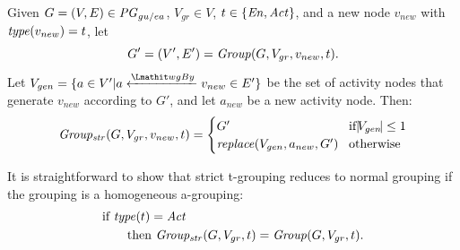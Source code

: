 \begin{definition}
Given 
$G=(V,E) \in \mathit{PG}_{gu/ea}$, $V_{gr} \in V$, $t \in \{\mathit{En}, \mathit{Act}\}$, and a new node $v_{new}$ with $\mathit{type}(v_{new}) = t$, let
\[ G' = (V',E') = \mathit{Group}(G, V_{gr}, v_{new}, t). \]
Let 
$V_{gen} = \{ a \in V' |  a \xleftarrow{\wgby} v_{new} \in E' \}$ be the set of activity nodes that generate $v_{new}$ according to $G'$, and let $a_{new}$ be a new activity node. Then:
\begin{equation*}
\mathit{Group_{str}}(G, V_{gr},v_{new}, t)=
\begin{cases}
G' & \!\text{if}  |\!V_{gen}\!| \leq 1  \\
\mathit{replace}(V_{gen}, a_{new}, G') & \!\text{otherwise } 
\end{cases}
\end{equation*}
\label{def:strict-t-grouping}
\end{definition}
%
It is straightforward to show that strict t-grouping reduces to normal grouping if the grouping is a homogeneous a-grouping:
\begin{align*}
&\text{if } \mathit{type}(t) =  \mathit{Act} \\
 &\qquad\text{then } \mathit{Group_{str}}(G, V_{gr},t) = \mathit{Group}(G, V_{gr},t). 
\end{align*}


